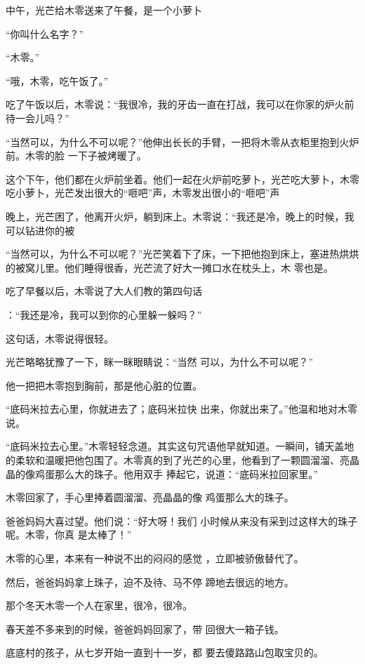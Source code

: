 \documentclass{article}
\begin{document}
中午，光芒给木零送来了午餐，是一个小萝卜


“你叫什么名字？” 


“木零。” 


“哦，木零，吃午饭了。” 

\newpage

吃了午饭以后，木零说：“我很冷，我的牙齿一直在打战，我可以在你家的炉火前待一会儿吗？”

“当然可以，为什么不可以呢？”他伸出长长的手臂，一把将木零从衣柜里抱到火炉前。木零的脸
一下子被烤暖了。 

这个下午，他们都在火炉前坐着。他们一起在火炉前吃萝卜，光芒吃大萝卜，木零吃小萝卜，光芒发出很大的“咂吧”声，木零发出很小的“咂吧”声

晚上，光芒困了，他离开火炉，躺到床上。木零说：“我还是冷，晚上的时候，我可以钻进你的被

“当然可以，为什么不可以呢？”光芒笑着下了床，一下把他抱到床上，塞进热烘烘的被窝儿里。他们睡得很香，光芒流了好大一摊口水在枕头上，木
零也是。 

吃了早餐以后，木零说了大人们教的第四句话

\newpage
：“我还是冷，我可以到你的心里躲一躲吗？” 


这句话，木零说得很轻。 

光芒略略犹豫了一下，眯一眯眼睛说：“当然
可以，为什么不可以呢？” 

他一把把木零抱到胸前，那是他心脏的位置。

“底码米拉去心里，你就进去了；底码米拉快
出来，你就出来了。”他温和地对木零说。 

“底码米拉去心里。”木零轻轻念道。其实这句咒语他早就知道。一瞬间，铺天盖地的柔软和温暖把他包围了。木零真的到了光芒的心里，他看到了一颗圆溜溜、亮晶晶的像鸡蛋那么大的珠子。他用双手
捧起它，说道：“底码米拉回家里。” 

木零回家了，手心里捧着圆溜溜、亮晶晶的像
鸡蛋那么大的珠子。 

爸爸妈妈大喜过望。他们说：“好大呀！我们
\newpage
小时候从来没有采到过这样大的珠子呢。木零，你真
是太棒了！” 

木零的心里，本来有一种说不出的闷闷的感觉
，立即被骄傲替代了。 

然后，爸爸妈妈拿上珠子，迫不及待、马不停
蹄地去很远的地方。 


那个冬天木零一个人在家里，很冷，很冷。 

春天差不多来到的时候，爸爸妈妈回家了，带
回很大一箱子钱。 

底底村的孩子，从七岁开始一直到十一岁，都
要去傻路路山包取宝贝的。 
\end{document}
